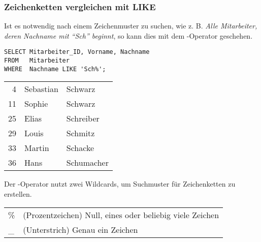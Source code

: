\subsubsection{Zeichenketten vergleichen mit LIKE}
Ist es notwendig nach einem Zeichenmuster zu suchen, wie z. B. \textit{Alle Mitarbeiter, deren Nachname mit \enquote{Sch} beginnt}, so kann dies mit dem -Operator geschehen.
\begin{lstlisting}[language=oracle_sql,caption={Zeichenkettensuche mit einem Suchmuster},label=sql02_08]
SELECT Mitarbeiter_ID, Vorname, Nachname
FROM   Mitarbeiter
WHERE  Nachname LIKE 'Sch%';
          \end{lstlisting}
\begin{center}
    \begin{small}
        \tablehead{}
        \tabletail{
        }
        \begin{msoraclesql}
            \begin{supertabular}{rll}
                4 & Sebastian & Schwarz \\
                11 & Sophie & Schwarz \\
                25 & Elias & Schreiber \\
                29 & Louis & Schmitz \\
                33 & Martin & Schacke \\
                36 & Hans & Schumacher \\
            \end{supertabular}
        \end{msoraclesql}
    \end{small}
\end{center}
Der -Operator nutzt zwei Wildcards, um Suchmuster für Zeichenketten zu erstellen.
\begin{center}
    \label{likewildcards}
    \begin{small}
        \tabletail{
            \hline
        }
        \tablelasttail{
            \hline
        }
        \begin{supertabular}{lp{10cm}}
            \% & (Prozentzeichen) Null, eines oder beliebig viele Zeichen \\
            \_ & (Unterstrich) Genau ein Zeichen \\
        \end{supertabular}
    \end{small}
\end{center}
